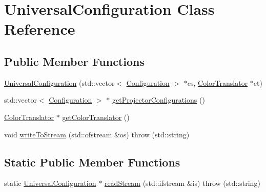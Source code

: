 \hypertarget{classUniversalConfiguration}{
\section{UniversalConfiguration Class Reference}
\label{classUniversalConfiguration}
}
\subsection*{Public Member Functions}
\begin{DoxyCompactItemize}
\item 
\hyperlink{classUniversalConfiguration_acf91d2417df506abf0f5c8641c539d0c}{UniversalConfiguration} (std::vector$<$ \hyperlink{classConfiguration}{Configuration} $>$ $\ast$cs, \hyperlink{classColorTranslator}{ColorTranslator} $\ast$ct)
\item 
std::vector$<$ \hyperlink{classConfiguration}{Configuration} $>$ $\ast$ \hyperlink{classUniversalConfiguration_a1bcb01f20c8a022736cd0b26210c34a3}{getProjectorConfigurations} ()
\item 
\hyperlink{classColorTranslator}{ColorTranslator} $\ast$ \hyperlink{classUniversalConfiguration_a78dac986a22dbfc2b53acfaf633503d9}{getColorTranslator} ()
\item 
void \hyperlink{classUniversalConfiguration_ae54c8cfbd39860caa0427b500489ef59}{writeToStream} (std::ofstream \&os)  throw (std::string)
\end{DoxyCompactItemize}
\subsection*{Static Public Member Functions}
\begin{DoxyCompactItemize}
\item 
static \hyperlink{classUniversalConfiguration}{UniversalConfiguration} $\ast$ \hyperlink{classUniversalConfiguration_acfce05a2995755d57901bf69df229ff0}{readStream} (std::ifstream \&is)  throw (std::string)
\end{DoxyCompactItemize}


